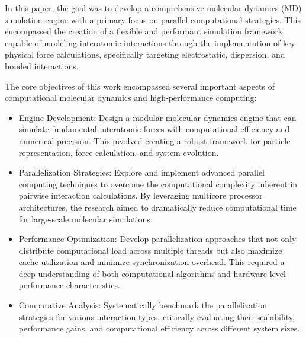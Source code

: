 \documentclass[conference]{IEEEtran}
\begin{document}


In this paper, the goal was to develop a comprehensive molecular dynamics (MD) simulation engine with a primary focus 
on parallel computational strategies. This encompassed the creation of a flexible and performant simulation framework 
capable of modeling interatomic interactions through the implementation of key physical force calculations, 
specifically targeting electrostatic, dispersion, and bonded interactions.

The core objectives of this work encompassed several important aspects of computational molecular dynamics and 
high-performance computing:
\begin{itemize}
    \item Engine Development: Design a modular molecular dynamics engine that can simulate fundamental interatomic 
    forces with computational efficiency and numerical precision. This involved creating a robust framework for 
    particle representation, force calculation, and system evolution.

    \item Parallelization Strategies: Explore and implement advanced parallel computing techniques to overcome the 
    computational complexity inherent in pairwise interaction calculations. By leveraging multicore processor 
    architectures, the research aimed to dramatically reduce computational time for large-scale molecular simulations.

    \item Performance Optimization: Develop parallelization approaches that not only distribute computational load 
    across multiple threads but also maximize cache utilization and minimize synchronization overhead. This required 
    a deep understanding of both computational algorithms and hardware-level performance characteristics.

    \item Comparative Analysis: Systematically benchmark the parallelization strategies for various interaction types, 
    critically evaluating their scalability, performance gains, and computational efficiency across different system 
    sizes.
\end{itemize}
\end{document}
